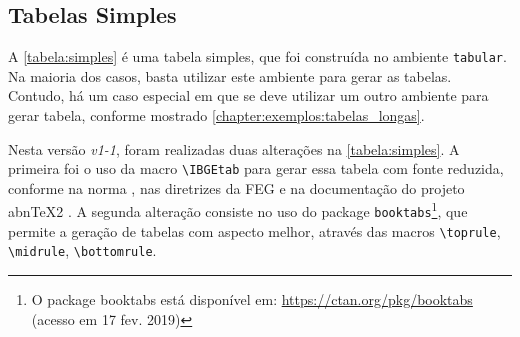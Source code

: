 \documentclass[
  12pt,		%
  a4paper,	%
  openright,%
  oneside,	%
  chapter=TITLE,		%
  section=TITLE,		%
  english,	%
  french,	%
  spanish,	%
  brazil
]{abntex2}
\begin{document}
         
         \subsection {Tabelas Simples}
                
                A \autoref{tabela:simples} é uma tabela simples, que foi construída no ambiente \verb|tabular|. Na maioria dos casos, basta utilizar este ambiente para gerar as tabelas. Contudo, há um caso especial em que se deve utilizar um outro ambiente para gerar tabela, conforme mostrado \autoref{chapter:exemplos:tabelas_longas}. 
                
                \begin{table}[h]
                \end{table}
                
                
                Nesta versão \emph{v1-1}, foram realizadas duas alterações na \autoref{tabela:simples}. A primeira foi o uso da macro \verb|\IBGEtab| para gerar essa tabela com fonte reduzida, conforme na norma \cite{ibge1993}, nas diretrizes da FEG \cite[p.~39]{diretrizes2016} e na documentação do projeto abn\TeX2 \cite[p.~39--40]{abntex2classe}. A segunda alteração consiste no uso do package \verb|booktabs|\footnote{O package booktabs está disponível em: \url{https://ctan.org/pkg/booktabs} (acesso em 17 fev. 2019)}, que permite a geração de tabelas com aspecto melhor, através das macros \verb|\toprule|, \verb|\midrule|, \verb|\bottomrule|.
                
\end{document}
